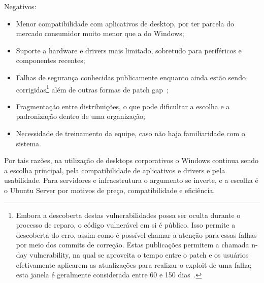Negativos:
\begin{itemize}
	\item Menor compatibilidade com aplicativos de desktop, por ter parcela do mercado consumidor muito menor que a do Windows;
	\item Suporte a hardware e drivers mais limitado, sobretudo para periféricos e componentes recentes;
	\item Falhas de segurança conhecidas publicamente enquanto ainda estão sendo corrigidas\footnote{Embora a descoberta destas vulnerabilidades possa ser oculta durante o processo de reparo, o código vulnerável em si é público. Isso permite a descoberta do erro, assim como é possível chamar a atenção para essas falhas por meio dos commits de correção. Estas publicações permitem a chamada n-day vulnerability, na qual se aproveita o tempo entre o patch e os usuários efetivamente aplicarem as atualizações para realizar o exploit de uma falha; esta janela é geralmente considerada entre 60 e 150 dias~\cite{nDay}.} além de outras formas de patch gap~\cite{patchGap};
	\item Fragmentação entre distribuições, o que pode dificultar a escolha e a padronização dentro de uma organização;
	\item Necessidade de treinamento da equipe, caso não haja familiaridade com o sistema.
\end{itemize}

Por tais razões, na utilização de desktops corporativos o Windows continua sendo a escolha principal, pela compatibilidade de aplicativos e drivers e pela usabilidade. Para servidores e infraestrutura o argumento se inverte, e a escolha é o Ubuntu Server por motivos de preço, compatibilidade e eficiência.